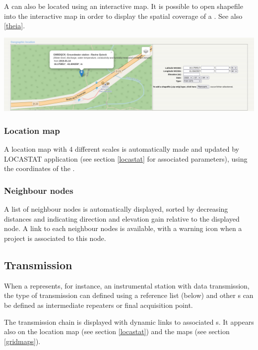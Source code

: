 A  can also be located using an interactive map. It is possible to open shapefile into the interactive map in order to display the spatial coverage of a . See also \ref{theia}.

\includegraphics[width=\textwidth]{figures/interactive_map.png}

\subsubsection{Location map}

A location map with 4 different scales is automatically made and updated by LOCASTAT application (see section \ref{locastat} for associated parameters), using the coordinates of the .


\subsubsection{Neighbour nodes}

A list of neighbour nodes is automatically displayed, sorted by decreasing distances and indicating direction and elevation gain relative to the displayed node. A link to each neighbour nodes is available, with a warning icon when a project is associated to this node. 

\subsection{Transmission}

When a  represents, for instance, an instrumental station with data transmission, the type of transmission can defined using a reference list (below) and other s can be defined as intermediate repeaters or final acquisition point.

The transmission chain is displayed with dynamic links to associated s. It appears also on the location map (see section \ref{locastat}) and the  maps (see section \ref{gridmaps}).

